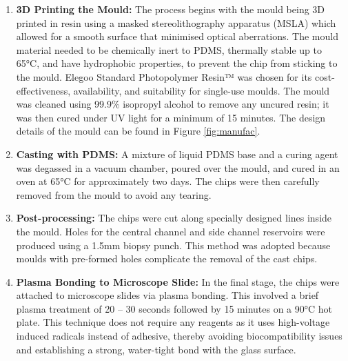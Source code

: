 \documentclass[letterpaper,12pt]{article}
\begin{document}
\begin{enumerate}
\item \textbf{3D Printing the Mould:} The process begins with the mould being 3D printed in resin using a masked stereolithography apparatus (MSLA) which allowed for a smooth surface that minimised optical aberrations. The mould material needed to be chemically inert to PDMS,  thermally stable up to 65°C, and have hydrophobic properties\parencite{a2019_elegoo}, to prevent the chip from sticking to the mould. Elegoo Standard Photopolymer Resin™ was chosen for its cost-effectiveness, availability, and suitability for single-use moulds. The mould was cleaned using 99.9\% isopropyl alcohol to remove any uncured resin; it was then cured under UV light for a minimum of 15 minutes. The design details of the mould can be found in Figure \ref{fig:manufac}.

\item \textbf{Casting with PDMS:} A mixture of liquid PDMS base and a curing agent was degassed in a vacuum chamber, poured over the mould, and cured in an oven at 65°C for approximately two days. The chips were then carefully removed from the mould to avoid any tearing. 

\item \textbf{Post-processing:} The chips were cut along specially designed lines inside the mould. Holes for the central channel and side channel reservoirs were produced using a 1.5mm biopsy punch. This method was adopted because moulds with pre-formed holes complicate the removal of the cast chips. 

\item \textbf{Plasma Bonding to Microscope Slide:} In the final stage, the chips were attached to microscope slides via plasma bonding. This involved a brief plasma treatment of 20 – 30 seconds followed by 15 minutes on a 90°C hot plate. This technique does not require any reagents as it uses high-voltage induced radicals instead of adhesive, thereby avoiding biocompatibility issues and establishing a strong, water-tight bond with the glass surface. 

\end{enumerate}
\end{document}
